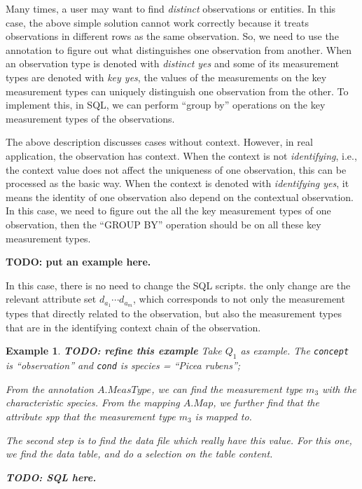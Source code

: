 \documentclass[conference]{IEEEtran}
\newtheorem{example}{\bf Example}[section]
\begin{document}
Many times, a user may want to find {\em distinct} observations or
entities. In this case, the above simple solution cannot work
correctly because it treats observations in different rows as the same
observation. So, we need to use the annotation to figure out what
distinguishes one observation from another. 
When an observation type is denoted with {\em distinct yes} and some
of its measurement types are denoted with {\em key yes}, 
the values of the measurements on the key measurement types can
uniquely distinguish one observation from the other. 
To implement this, in SQL, we can perform ``group by'' operations on
the key measurement types of the observations. 

The above description discusses cases without context. 
However, in real application, the observation has context. 
When the context is not {\em identifying}, i.e., the context value
does not affect the uniqueness of one observation, this can be
processed as the basic way. 
When the context is denoted with {\em identifying yes}, it means the
identity of one observation also depend on the contextual
observation. 
In this case, we need to figure out the all the key measurement types
of one observation, then the ``GROUP BY'' operation should be on all
these key measurement types. 

{\bf TODO: put an example here.}

In this case, there is no need to change the SQL scripts.
the only change are the relevant attribute set $d_{a_1} \cdots
d_{a_m}$, which corresponds to not only the measurement types that
directly related to the observation, but also the measurement types
that are in the identifying context chain of the observation. 

\begin{example}\label{eg:query_reqerite_q1}
{\bf TODO: refine this example} 
Take $Q_1$ as example. The {\tt concept} is ``observation'' and {\tt cond} is {\em species = ``Picea rubens''}; 

From the annotation $A.MeasType$, we can find the measurement type
$m_3$ with the characteristic {\em species}. 
From the mapping $A.Map$, we further find that the attribute {\em spp} that the
measurement type $m_3$ is mapped to. 

The second step is to find the data file which really have this value. 
For this one, we find the data table, and do a selection on the table
content. 

{\bf TODO: SQL here.} 
\end{example}
\end{document}
